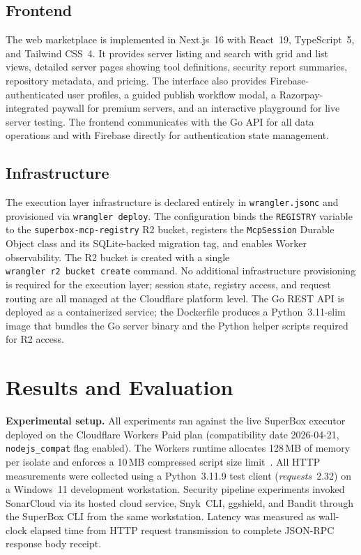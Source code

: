 \documentclass[conference]{IEEEtran}
\begin{document}
\subsection{Frontend}

The web marketplace is implemented in Next.js~16 with React~19,
TypeScript~5, and Tailwind CSS~4.
It provides server listing and search with grid and list views,
detailed server pages showing tool definitions, security report
summaries, repository metadata, and pricing.
The interface also provides Firebase-authenticated user profiles, a
guided publish workflow modal, a Razorpay-integrated paywall for premium
servers, and an interactive playground for live server testing.
The frontend communicates with the Go API for all data operations and
with Firebase directly for authentication state management.

\subsection{Infrastructure}

The execution layer infrastructure is declared entirely in
\texttt{wrangler.jsonc} and provisioned via \texttt{wrangler deploy}.
The configuration binds the \texttt{REGISTRY} variable to the
\texttt{superbox-mcp-registry} R2 bucket, registers the
\texttt{McpSession} Durable Object class and its SQLite-backed migration
tag, and enables Worker observability.
The R2 bucket is created with a single
\texttt{wrangler~r2~bucket~create} command.
No additional infrastructure provisioning is required for the execution
layer; session state, registry access, and request routing are all
managed at the Cloudflare platform level.
The Go REST API is deployed as a containerized service; the Dockerfile
produces a Python~3.11-slim image that bundles the Go server binary
and the Python helper scripts required for R2 access.

\section{Results and Evaluation}
\label{sec:results}

\textbf{Experimental setup.}
All experiments ran against the live SuperBox executor deployed on the
Cloudflare Workers Paid plan (compatibility date 2026-04-21,
\texttt{nodejs\_compat} flag enabled).
The Workers runtime allocates 128\,MB of memory per isolate and enforces
a 10\,MB compressed script size limit~\cite{cloudflare2025limits}.
All HTTP measurements were collected using a Python~3.11.9 test client
(\textit{requests}~2.32) on a Windows~11 development workstation.
Security pipeline experiments invoked SonarCloud via its hosted cloud
service, Snyk~CLI, ggshield, and Bandit through the SuperBox CLI from
the same workstation.
Latency was measured as wall-clock elapsed time from HTTP request
transmission to complete JSON-RPC response body receipt.
\end{document}
